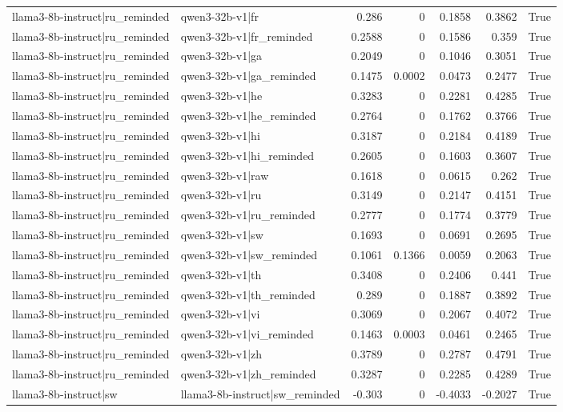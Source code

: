 \begin{table}
\begin{tabular}{l l r r r r l}
llama3-8b-instruct|ru_reminded & qwen3-32b-v1|fr & 0.286 & 0 & 0.1858 & 0.3862 & True \\
llama3-8b-instruct|ru_reminded & qwen3-32b-v1|fr_reminded & 0.2588 & 0 & 0.1586 & 0.359 & True \\
llama3-8b-instruct|ru_reminded & qwen3-32b-v1|ga & 0.2049 & 0 & 0.1046 & 0.3051 & True \\
llama3-8b-instruct|ru_reminded & qwen3-32b-v1|ga_reminded & 0.1475 & 0.0002 & 0.0473 & 0.2477 & True \\
llama3-8b-instruct|ru_reminded & qwen3-32b-v1|he & 0.3283 & 0 & 0.2281 & 0.4285 & True \\
llama3-8b-instruct|ru_reminded & qwen3-32b-v1|he_reminded & 0.2764 & 0 & 0.1762 & 0.3766 & True \\
llama3-8b-instruct|ru_reminded & qwen3-32b-v1|hi & 0.3187 & 0 & 0.2184 & 0.4189 & True \\
llama3-8b-instruct|ru_reminded & qwen3-32b-v1|hi_reminded & 0.2605 & 0 & 0.1603 & 0.3607 & True \\
llama3-8b-instruct|ru_reminded & qwen3-32b-v1|raw & 0.1618 & 0 & 0.0615 & 0.262 & True \\
llama3-8b-instruct|ru_reminded & qwen3-32b-v1|ru & 0.3149 & 0 & 0.2147 & 0.4151 & True \\
llama3-8b-instruct|ru_reminded & qwen3-32b-v1|ru_reminded & 0.2777 & 0 & 0.1774 & 0.3779 & True \\
llama3-8b-instruct|ru_reminded & qwen3-32b-v1|sw & 0.1693 & 0 & 0.0691 & 0.2695 & True \\
llama3-8b-instruct|ru_reminded & qwen3-32b-v1|sw_reminded & 0.1061 & 0.1366 & 0.0059 & 0.2063 & True \\
llama3-8b-instruct|ru_reminded & qwen3-32b-v1|th & 0.3408 & 0 & 0.2406 & 0.441 & True \\
llama3-8b-instruct|ru_reminded & qwen3-32b-v1|th_reminded & 0.289 & 0 & 0.1887 & 0.3892 & True \\
llama3-8b-instruct|ru_reminded & qwen3-32b-v1|vi & 0.3069 & 0 & 0.2067 & 0.4072 & True \\
llama3-8b-instruct|ru_reminded & qwen3-32b-v1|vi_reminded & 0.1463 & 0.0003 & 0.0461 & 0.2465 & True \\
llama3-8b-instruct|ru_reminded & qwen3-32b-v1|zh & 0.3789 & 0 & 0.2787 & 0.4791 & True \\
llama3-8b-instruct|ru_reminded & qwen3-32b-v1|zh_reminded & 0.3287 & 0 & 0.2285 & 0.4289 & True \\
llama3-8b-instruct|sw & llama3-8b-instruct|sw_reminded & -0.303 & 0 & -0.4033 & -0.2027 & True \\

\end{tabular}
\end{table}
